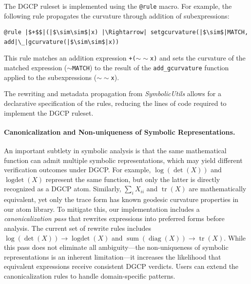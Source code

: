 \documentclass[twoside,11pt]{article}
\begin{document}
The DGCP ruleset is implemented using the \texttt{@rule} macro. For example, the following rule propagates the curvature through addition of subexpressions:

\begin{listing}[h!]
\label{rulecurv}
\begin{verbatim}
@rule |$+$$|(|$\sim\sim$|x) |\Rightarrow| setgcurvature(|$\sim$|MATCH, add|\_|gcurvature(|$\sim\sim$|x))
\end{verbatim}
\caption{Using the \texttt{@rule} macro for propagating Geodesic Curvature through addition}
\end{listing}

This rule matches an addition expression \texttt{+($\sim\sim$x)} and sets the curvature of the matched expression (\texttt{$\sim$MATCH}) to the result of the \texttt{add\_gcurvature} function applied to the subexpressions (\texttt{$\sim\sim$x}).

The rewriting and metadata propagation from \textsl{SymbolicUtils} allows for a declarative specification of the rules, reducing the lines of code required to implement the DGCP ruleset.

\paragraph{Canonicalization and Non-uniqueness of Symbolic Representations.}
An important subtlety in symbolic analysis is that the same mathematical function can admit multiple symbolic representations, which may yield different verification outcomes under DGCP. For example, $\log(\det(X))$ and $\operatorname{logdet}(X)$ represent the same function, but only the latter is directly recognized as a DGCP atom. Similarly, $\sum_{i} X_{ii}$ and $\operatorname{tr}(X)$ are mathematically equivalent, yet only the trace form has known geodesic curvature properties in our atom library. To mitigate this, our implementation includes a \emph{canonicalization pass} that rewrites expressions into preferred forms before analysis. The current set of rewrite rules includes $\log(\det(X)) \to \operatorname{logdet}(X)$ and $\operatorname{sum}(\operatorname{diag}(X)) \to \operatorname{tr}(X)$. While this pass does not eliminate all ambiguity---the non-uniqueness of symbolic representations is an inherent limitation---it increases the likelihood that equivalent expressions receive consistent DGCP verdicts. Users can extend the canonicalization rules to handle domain-specific patterns.
\end{document}
